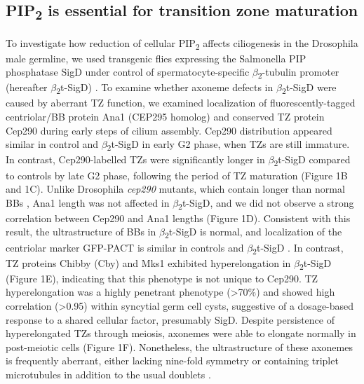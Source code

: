 \documentclass[12pt, twoside, letterpaper]{article}
\newcommand{\PIP}{PIP\textsubscript{2}}
\newcommand{\sigd}{$\beta$\textsubscript{2}t-SigD}
\begin{document}
\begin{doublespacing}
\begin{linenumbers}
    \subsection*{\PIP{} is essential for transition zone maturation}
    To investigate how reduction of cellular \PIP{} affects ciliogenesis in the
    Drosophila male germline,
    we used transgenic flies expressing the Salmonella PIP phosphatase SigD
    under control of spermatocyte-specific $\beta$\textsubscript{2}-tubulin promoter
    (hereafter \sigd{})
    \citep{wei2008depletion}.
    To examine whether axoneme defects in \sigd{}
    \citep{wei2008depletion}
    were caused by aberrant TZ function,
    we examined localization of fluorescently-tagged
    centriolar/BB protein
    Ana1 (CEP295 homolog) \citep{goshima2007genes, blachon2009proximal}
    and conserved TZ protein Cep290 \citep{basiri2014migrating}
    during early steps of cilium assembly.
    Cep290 distribution appeared similar in control and \sigd{} in early G2 phase,
    when TZs are still immature.
    In contrast, Cep290-labelled TZs were significantly longer in \sigd{}
    compared to controls by late G2 phase, following
    the period of TZ maturation (Figure 1B and 1C).
    Unlike Drosophila \textit{cep290} mutants, which contain
    longer than normal BBs \citep{basiri2014migrating},
    Ana1 length was not affected in \sigd{},
    and we did not observe a strong
    correlation between Cep290 and Ana1 lengths (Figure 1D).
    Consistent with this result, the ultrastructure of BBs in \sigd{}
    is normal, and localization of the centriolar
    marker GFP-PACT \citep{basto2006flies}
    is similar in controls and \sigd{} \citep{wei2008depletion}.
    In contrast, TZ proteins Chibby (Cby) \citep{enjolras2012drosophila} and
    Mks1 \citep{vieillard2016transition, pratt2016drosophila}
    exhibited hyperelongation in \sigd{} (Figure 1E),
    indicating that this phenotype is not unique to Cep290.
    TZ hyperelongation was a highly penetrant phenotype (\textgreater 70\%)
    and showed high correlation (\textgreater 0.95)
    within syncytial germ cell cysts,
    suggestive of a dosage-based response to a shared cellular factor,
    presumably SigD.
    Despite persistence of hyperelongated TZs through meiosis,
    axonemes were able to
    elongate normally in post-meiotic cells (Figure 1F).
    Nonetheless, the ultrastructure of these axonemes
    is frequently aberrant,
    either lacking nine-fold symmetry or containing triplet microtubules
    in addition to the usual doublets \citep{wei2008depletion}.


\end{linenumbers}
\end{doublespacing}
\end{document}
